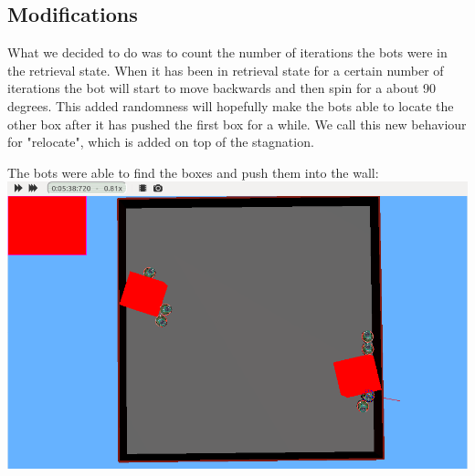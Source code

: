 \documentclass[12pt, a4paper]{article}
\begin{document}
\subsection{Modifications}
What we decided to do was to count the number of iterations the bots were in the retrieval state. When it has been in retrieval state for a certain number of iterations the bot will start to move backwards and then spin for a about 90 degrees. This added randomness will hopefully make the bots able to locate the other box after it has pushed the first box for a while.
We call this new behaviour for "relocate", which is added on top of the stagnation.

The bots were able to find the boxes and push them into the wall:\\
\includegraphics[width=\linewidth]{1.finalStateMulti.png}
\end{document}
